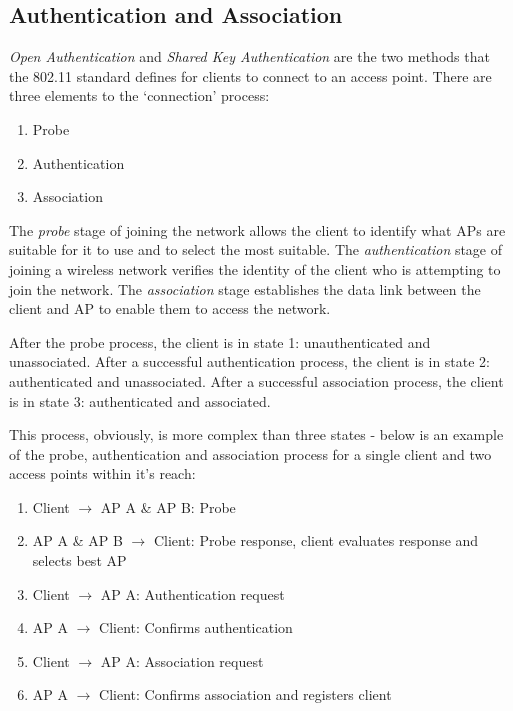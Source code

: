 \subsection{Authentication and Association}
\textit{Open Authentication} and \textit{Shared Key Authentication} are the two methods that the 802.11 standard defines for clients to connect to an access point. There are three elements to the `connection' process:
\begin{enumerate}
    \item Probe 
    \item Authentication
    \item Association
\end{enumerate}

The \textit{probe} stage of joining the network allows the client to identify what APs are suitable for it to use and to select the most suitable. The \textit{authentication} stage of joining a wireless network verifies the identity of the client who is attempting to join the network. The \textit{association} stage establishes the data link between the client and AP to enable them to access the network. 

After the probe process, the client is in state 1: unauthenticated and unassociated. After a successful authentication process, the client is in state 2: authenticated and unassociated. After a successful association process, the client is in state 3: authenticated and associated.

This process, obviously, is more complex than three states - below is an example of the probe, authentication and association process for a single client and two access points within it's reach:
\begin{enumerate}
    \item Client $\rightarrow$ AP A \& AP B: Probe
    \item AP A \& AP B $\rightarrow$ Client: Probe response, client evaluates response and selects best AP
    \item Client $\rightarrow$ AP A: Authentication request
    \item AP A $\rightarrow$ Client: Confirms authentication
    \item Client $\rightarrow$ AP A: Association request
    \item AP A $\rightarrow$ Client: Confirms association and registers client
\end{enumerate}

